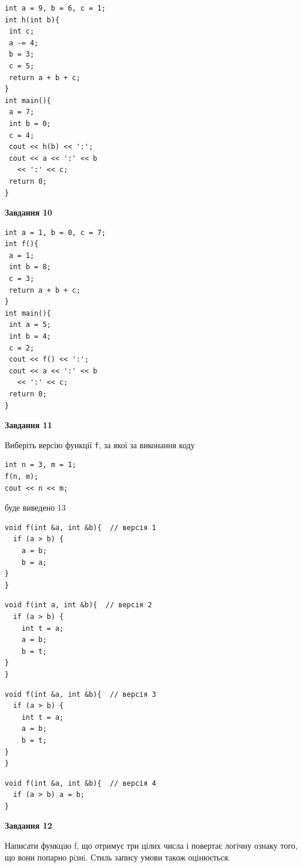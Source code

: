 \documentclass[12pt, ukrainian]{article}
\def\code#1{\Verb!#1!}
\begin{document}
{\begin {large}
\begin{minipage}[t]{7.0cm}
\begin{verbatim}
int a = 9, b = 6, c = 1;
int h(int b){
 int c;
 a -= 4;
 b = 3;
 c = 5;
 return a + b + c;
}
int main(){
 a = 7;
 int b = 0;
 c = 4;
 cout << h(b) << ':';
 cout << a << ':' << b 
   << ':' << c;
 return 0;
}
\end{verbatim}



\begin{center}
\textbf{Завдання 10}
\end{center}
\vspace{-8mm}

\begin{verbatim}
int a = 1, b = 0, c = 7;
int f(){
 a = 1;
 int b = 8;
 c = 3;
 return a + b + c;
}
int main(){
 int a = 5;
 int b = 4;
 c = 2;
 cout << f() << ':';
 cout << a << ':' << b 
   << ':' << c;
 return 0;
}
\end{verbatim}

\end{minipage}
\vline \hspace{1mm}
\begin{minipage}[t]{11.0cm}

\begin{center}
\textbf{Завдання 11}
\end{center}
Виберіть версію функції \code{f}, за якої за виконання коду
\begin{verbatim}
int n = 3, m = 1;
f(n, m);
cout << n << m;
\end{verbatim}

буде виведено 13

\begin{verbatim}
void f(int &a, int &b){  // версія 1
  if (a > b) {
    a = b;
    b = a;
}  
}
\end{verbatim}

\vspace{-8mm}\begin{verbatim}
void f(int a, int &b){  // версія 2
  if (a > b) {
    int t = a;
    a = b;
    b = t;
}  
}
\end{verbatim}

\vspace{-8mm}\begin{verbatim}
void f(int &a, int &b){  // версія 3
  if (a > b) {
    int t = a;
    a = b;
    b = t;
}  
}
\end{verbatim}

\vspace{-8mm}\begin{verbatim}
void f(int &a, int &b){  // версія 4
  if (a > b) a = b;
}
\end{verbatim}



\begin{center}
\textbf{Завдання 12}
\end{center}

Написати функцiю f, що отримує три цілих числа і повертає логічну ознаку того, що вони попарно рiзнi. Стиль запису умови також оцінюється.\par

\end{minipage}

\end {large}}
\end{document}
